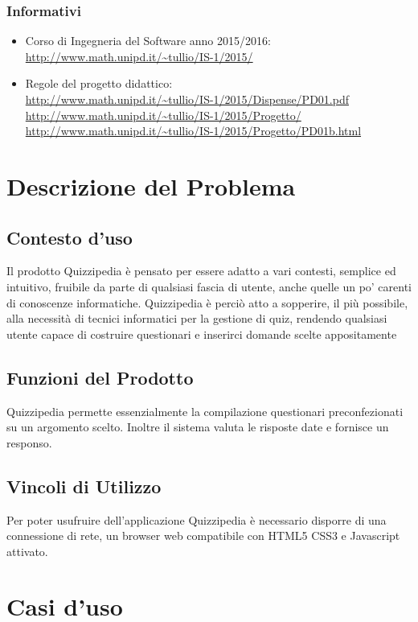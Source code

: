 \documentclass[a4paper,11pt]{article}
\begin{document}
		\subsubsection{Informativi}
		\begin{itemize}
			\item Corso di Ingegneria del Software anno 2015/2016:\\
			\url{http://www.math.unipd.it/~tullio/IS-1/2015/}
			\item Regole del progetto didattico:\\
			\url{http://www.math.unipd.it/~tullio/IS-1/2015/Dispense/PD01.pdf}
			\url{http://www.math.unipd.it/~tullio/IS-1/2015/Progetto/}\\
			\url{http://www.math.unipd.it/~tullio/IS-1/2015/Progetto/PD01b.html}
		\end{itemize}
	\pagebreak

	\newpage	
	\section{Descrizione del Problema}
	\subsection{Contesto d'uso}
		Il prodotto Quizzipedia è pensato per essere adatto a vari contesti, semplice ed intuitivo, fruibile da parte di qualsiasi fascia di utente, anche quelle un po' carenti di conoscenze informatiche. Quizzipedia è perciò atto a sopperire, il più possibile, alla necessità di tecnici
informatici per la gestione di quiz, rendendo qualsiasi utente capace di costruire questionari e inserirci domande scelte appositamente
	\subsection{Funzioni del Prodotto}
		Quizzipedia permette essenzialmente la compilazione questionari preconfezionati su un argomento scelto. Inoltre il sistema valuta le risposte date e fornisce un responso.
	\subsection{Vincoli di Utilizzo}
		Per poter usufruire dell'applicazione Quizzipedia è necessario disporre di una connessione di
rete, un browser web compatibile con HTML5 CSS3 e Javascript attivato.
	
	\newpage
	\section{Casi d'uso}
\end{document}
